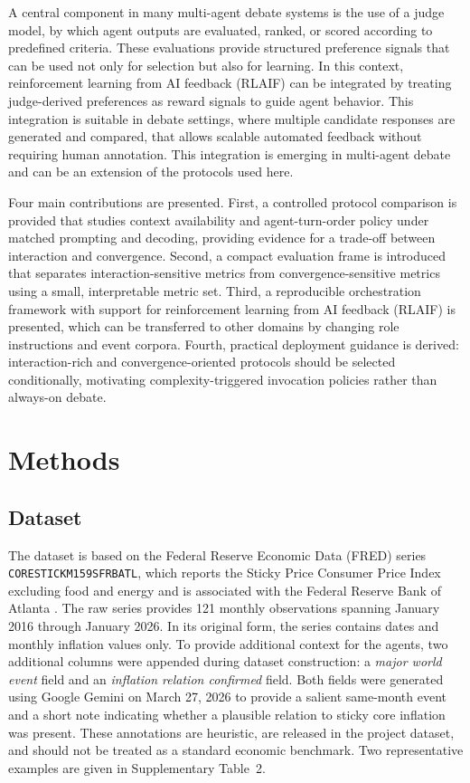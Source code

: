 \documentclass[11pt]{article}
\begin{document}
A central component in many multi-agent debate systems is the use of a judge model, by which agent outputs are evaluated, ranked, or scored according to predefined criteria. These evaluations provide structured preference signals that can be used not only for selection but also for learning. In this context, reinforcement learning from AI feedback (RLAIF) can be integrated by treating judge-derived preferences as reward signals to guide agent behavior. This integration is suitable in debate settings, where multiple candidate responses are generated and compared, that allows scalable automated feedback without requiring human annotation. This integration is emerging in multi-agent debate and can be an extension of the protocols used here.

Four main contributions are presented. First, a controlled protocol comparison is provided that studies context availability and agent-turn-order policy under matched prompting and decoding, providing evidence for a trade-off between interaction and convergence. Second, a compact evaluation frame is introduced that separates interaction-sensitive metrics from convergence-sensitive metrics using a small, interpretable metric set. Third, a reproducible orchestration framework with support for reinforcement learning from AI feedback (RLAIF) is presented, which can be transferred to other domains by changing role instructions and event corpora. Fourth, practical deployment guidance is derived: interaction-rich and convergence-oriented protocols should be selected conditionally, motivating complexity-triggered invocation policies rather than always-on debate.

\section{Methods}
\subsection{Dataset}
The dataset is based on the Federal Reserve Economic Data (FRED) series\\
\texttt{CORESTICKM159SFRBATL}, which reports the Sticky Price Consumer Price Index excluding food and energy and is associated with the Federal Reserve Bank of Atlanta \citep{fredcorestick2026}. The raw series provides 121 monthly observations spanning January 2016 through January 2026. In its original form, the series contains dates and monthly inflation values only. To provide additional context for the agents, two additional columns were appended during dataset construction: a \emph{major world event} field and an \emph{inflation relation confirmed} field. Both fields were generated using Google Gemini on March 27, 2026 to provide a salient same-month event and a short note indicating whether a plausible relation to sticky core inflation was present. These annotations are heuristic, are released in the project dataset, and should not be treated as a standard economic benchmark. Two representative examples are given in Supplementary Table~2.
\end{document}
